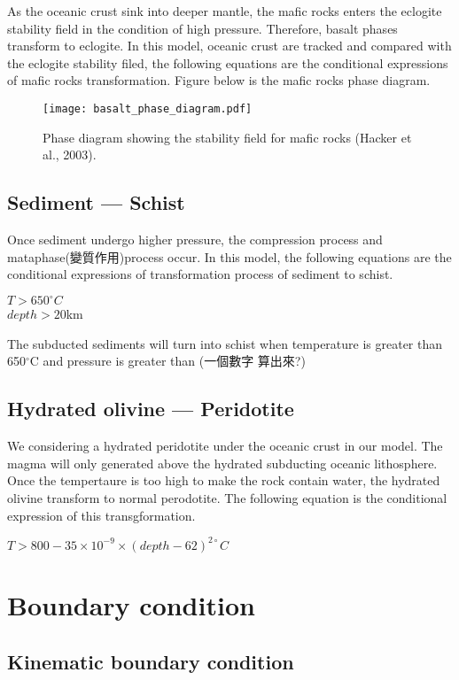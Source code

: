 As the oceanic crust sink into deeper mantle, the mafic rocks enters the eclogite stability field in the condition of high pressure. 
Therefore, basalt phases transform to eclogite.  
In this model, oceanic crust are tracked and compared with the eclogite stability filed, the following equations are the conditional expressions of mafic rocks transformation. 
Figure below is the mafic rocks phase diagram.
\begin{figure*}[ht!]
    \centering
    \texttt{[image: basalt\_phase\_diagram.pdf]}
    \caption{ Phase diagram showing the stability field for mafic rocks (Hacker et al., 2003).  }
    \label{fig::elastic}
\end{figure*}

\subsection{Sediment --- Schist}

Once sediment undergo higher pressure, the compression process and mataphase(變質作用)process occur.
In this model, the following equations are the conditional expressions of transformation process of sediment to schist.

$T > 650^{\circ} C$\\
$depth >  20 $km 

The subducted sediments will turn into schist when temperature is greater than 650$^\circ$C and pressure is greater than (一個數字 算出來?)

\subsection{Hydrated olivine --- Peridotite}

We considering a hydrated peridotite under the oceanic crust in our model. 
The magma will only generated above the hydrated subducting oceanic lithosphere.
Once the tempertaure is too high to make the rock contain water, the hydrated olivine transform to normal perodotite.
The following equation is the conditional expression of this transgformation.

$T > 800-35\times 10^{-9}\times (depth-62)^{2\circ}C$

\section{Boundary condition}

\subsection{Kinematic boundary condition}

